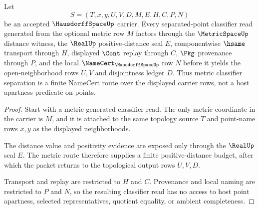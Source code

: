 \begin{theorem}
\label{thm:hausdorff-space-classifier-separation-route}
Let
$$
S=(T,x,y,U,V,D,M,E,H,C,P,N)
$$
be an accepted $\HausdorffSpaceUp$ carrier. Every separated-point classifier read generated from the optional metric row $M$ factors through the $\MetricSpaceUp$ distance witness, the $\RealUp$ positive-distance seal $E$, componentwise $\hsame$ transport through $H$, displayed $\Cont$ replay through $C$, $\Pkg$ provenance through $P$, and the local $\NameCert_{\HausdorffSpaceUp}$ row $N$ before it yields the open-neighborhood rows $U,V$ and disjointness ledger $D$. Thus metric classifier separation is a finite NameCert route over the displayed carrier rows, not a host apartness predicate on points.
\end{theorem}
\begin{proof}
Start with a metric-generated classifier read. The only metric coordinate in the carrier is $M$, and it is attached to the same topology source $T$ and point-name rows $x,y$ as the displayed neighborhoods.

The distance value and positivity evidence are exposed only through the $\RealUp$ seal $E$. The metric route therefore supplies a finite positive-distance budget, after which the packet returns to the topological output rows $U,V,D$.

Transport and replay are restricted to $H$ and $C$. Provenance and local naming are restricted to $P$ and $N$, so the resulting classifier read has no access to host point apartness, selected representatives, quotient equality, or ambient completeness.
\end{proof}

